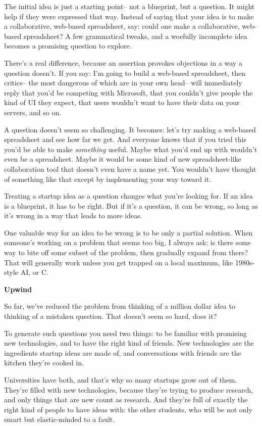 The initial idea is just a starting point-- not a blueprint, but a
question. It might help if they were expressed that way. Instead of
saying that your idea is to make a collaborative, web-based spreadsheet,
say: could one make a collaborative, web-based spreadsheet? A few
grammatical tweaks, and a woefully incomplete idea becomes a promising
question to explore.

There's a real difference, because an assertion provokes objections in a
way a question doesn't. If you say: I'm going to build a web-based
spreadsheet, then critics-- the most dangerous of which are in your own
head-- will immediately reply that you'd be competing with Microsoft,
that you couldn't give people the kind of UI they expect, that users
wouldn't want to have their data on your servers, and so on.

A question doesn't seem so challenging. It becomes: let's try making a
web-based spreadsheet and see how far we get. And everyone knows that if
you tried this you'd be able to make \emph{something} useful. Maybe what
you'd end up with wouldn't even be a spreadsheet. Maybe it would be some
kind of new spreadsheet-like collaboration tool that doesn't even have a
name yet. You wouldn't have thought of something like that except by
implementing your way toward it.

Treating a startup idea as a question changes what you're looking for.
If an idea is a blueprint, it has to be right. But if it's a question,
it can be wrong, so long as it's wrong in a way that leads to more
ideas.

One valuable way for an idea to be wrong is to be only a partial
solution. When someone's working on a problem that seems too big, I
always ask: is there some way to bite off some subset of the problem,
then gradually expand from there? That will generally work unless you
get trapped on a local maximum, like 1980s-style AI, or C.

\textbf{Upwind}

So far, we've reduced the problem from thinking of a million dollar idea
to thinking of a mistaken question. That doesn't seem so hard, does it?

To generate such questions you need two things: to be familiar with
promising new technologies, and to have the right kind of friends. New
technologies are the ingredients startup ideas are made of, and
conversations with friends are the kitchen they're cooked in.

Universities have both, and that's why so many startups grow out of
them. They're filled with new technologies, because they're trying to
produce research, and only things that are new count as research. And
they're full of exactly the right kind of people to have ideas with: the
other students, who will be not only smart but elastic-minded to a
fault.

